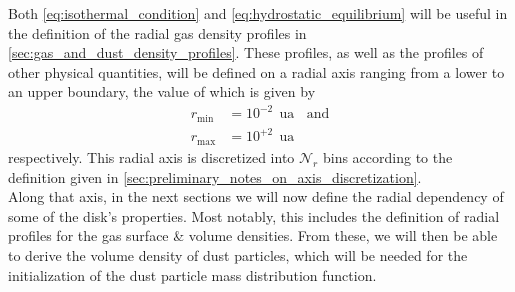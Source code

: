        Both \cref{eq:isothermal_condition} and \cref{eq:hydrostatic_equilibrium} will be useful 
        in the definition of the radial gas density profiles in
        \cref{sec:gas_and_dust_density_profiles}.
    These profiles, as well as the profiles of other physical quantities, will be defined on a 
    radial axis ranging from a lower to an upper boundary, the value of which is given by
    \begin{align}
        r_\text{min} &= 10^{-2}\ \SI{}{\astronomicalunit}
        \ \ \ \ \text{and} 
        \\
        r_\text{max} &= 10^{+2}\ \SI{}{\astronomicalunit}
    \end{align}
    respectively. This radial axis is discretized into $\mathcal N_r$ bins according to the 
    definition given in \cref{sec:preliminary_notes_on_axis_discretization}. \\

    Along that axis, in the next sections we will now define the radial dependency of some of the
    disk's properties. Most notably, this includes the definition of radial profiles for the gas 
    surface \& volume densities. From these, we will then be able to derive the volume density of
    dust particles, which will be needed for the initialization of the dust particle mass 
    distribution function. \\



